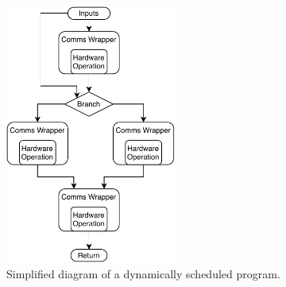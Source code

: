 \begin{figure}[htb!]
    \centering
    \includegraphics[width=0.5\textwidth]{Images/oversimplified_dyn.pdf}
    \caption{Simplified diagram of a dynamically scheduled program.}
    \label{fig:dynamic_simple}
\end{figure}